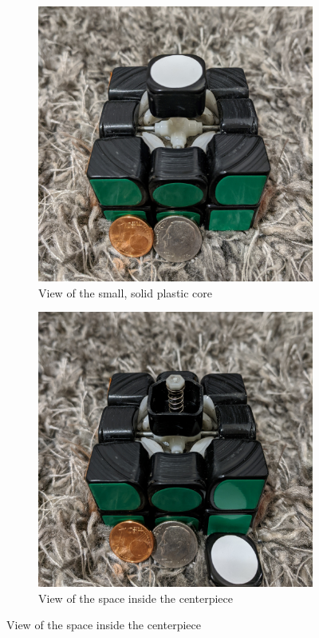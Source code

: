 \begin{figure}[h]
    \centering
    \caption{Internal pieces of a standard speedcube (Gans 356)}
    \label{fig:356-core}
    \begin{subfigure}{.45\textwidth}
        \centering
        \caption{View of the small, solid plastic core}
        \label{fig:356-core-closed}
        \includegraphics[width=\linewidth]{Figures/6 PCB Design/356_core_cropped.jpg}
    \end{subfigure}
    \begin{subfigure}{.45\textwidth}
        \centering
        \caption{View of the space inside the centerpiece}
        \label{fig:356-core-open}
        \includegraphics[width=\linewidth]{Figures/6 PCB Design/356_core_open_cropped.jpg}
    \end{subfigure}
\end{figure}


